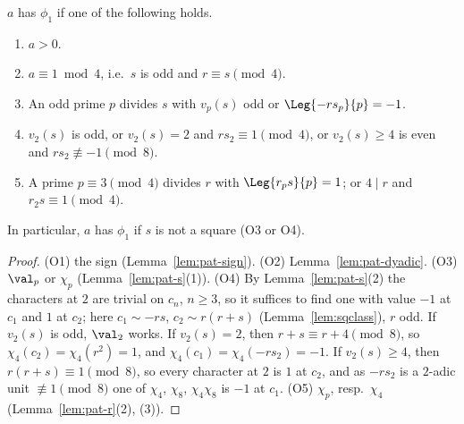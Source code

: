 \begin{proposition}
  \label{prop:O}
  \leanok
  $a$ has $\phi_1$ if one of the following holds.
  \begin{enumerate}
    \item[(O1)] $a > 0$.
    \item[(O2)] $a \equiv 1 \bmod 4$, i.e.\ $s$ is odd and $r \equiv s \pmod 4$.
    \item[(O3)] An odd prime $p$ divides $s$ with $v_p(s)$ odd or $\Leg{-r s_p}{p} = -1$.
    \item[(O4)] $v_2(s)$ is odd, or $v_2(s) = 2$ and $r s_2 \equiv 1 \pmod 4$, or $v_2(s) \ge 4$ is
          even and $r s_2 \not\equiv -1 \pmod 8$.
    \item[(O5)] A prime $p \equiv 3 \pmod 4$ divides $r$ with $\Leg{r_p s}{p} = 1$; or $4 \mid r$
          and $r_2 s \equiv 1 \pmod 4$.
  \end{enumerate}
  In particular, $a$ has $\phi_1$ if $s$ is not a square (O3 or O4).
\end{proposition}
\begin{proof}
  \leanok
  (O1) the sign (Lemma~\ref{lem:pat-sign}). (O2) Lemma~\ref{lem:pat-dyadic}. (O3) $\val_p$ or
  $\chi_p$ (Lemma~\ref{lem:pat-s}(1)). (O4) By Lemma~\ref{lem:pat-s}(2) the characters at $2$
  are trivial on $c_n$, $n \ge 3$, so it suffices to find one with value $-1$ at $c_1$ and $1$ at
  $c_2$; here $c_1 \sim -rs$, $c_2 \sim r(r+s)$ (Lemma~\ref{lem:sqclass}), $r$ odd. If $v_2(s)$ is
  odd, $\val_2$ works. If $v_2(s) = 2$, then $r + s \equiv r + 4 \pmod 8$, so
  $\chi_4(c_2) = \chi_4(r^2) = 1$, and $\chi_4(c_1) = \chi_4(-r s_2) = -1$. If $v_2(s) \ge 4$, then
  $r(r + s) \equiv 1 \pmod 8$, so every character at $2$ is $1$ at $c_2$, and as $-r s_2$ is a
  $2$-adic unit $\not\equiv 1 \pmod 8$ one of $\chi_4$, $\chi_8$, $\chi_4\chi_8$ is $-1$ at $c_1$.
  (O5) $\chi_p$, resp.\ $\chi_4$ (Lemma~\ref{lem:pat-r}(2), (3)).
\end{proof}

